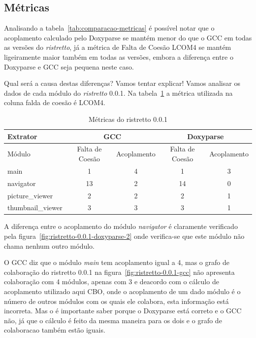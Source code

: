 \subsection{Métricas}

Analisando a tabela~\ref{tab:comparacao-metricas}  é possível notar que o acoplamento calculado pelo Doxyparse
se mantém menor do que o GCC em todas as versões do {\it ristretto}, já a métrica de
Falta de Coesão LCOM4 se mantém ligeiramente maior também em todas as versões,
embora a diferença entre o Doxyparse e GCC seja pequena neste caso.

Qual será a causa destas diferenças? Vamos tentar explicar! Vamos analisar os
dados de cada módulo do {\it ristretto} 0.0.1. Na
tabela~\ref{tab:comparacao-metricas-ristretto-0.0.1} a métrica utilizada na
coluna falda de coesão é LCOM4.

\begin{table}
\caption{Métricas do ristretto 0.0.1}
\centering
\begin{tabular}{| l | c c | c c |}
\hline
Extrator          & \multicolumn{2}{|c|}{GCC}        & \multicolumn{2}{|c|}{Doxyparse} \\
\hline
Módulo            & Falta de Coesão & Acoplamento    & Falta de Coesão & Acoplamento   \\
\hline
main              & 1               & 4              & 1               & 3             \\
navigator         & 13              & 2              & 14              & 0             \\
picture\_viewer   & 2               & 2              & 2               & 1             \\
thumbnail\_viewer & 3               & 3              & 3               & 1             \\
\hline
\end{tabular}
\label{tab:comparacao-metricas-ristretto-0.0.1}
\end{table}

A diferença entre o acoplamento do módulo {\it navigator} é claramente
verificado pela figura~\ref{fig:ristretto-0.0.1-doxyparse-2} onde verifica-se que
este módulo não chama nenhum outro módulo.

O GCC diz que o módulo {\it main} tem acoplamento igual a 4, mas o grafo de colaboração do ristretto 0.0.1 na figura~\ref{fig:ristretto-0.0.1-gcc} não apresenta colaboração com 4 módulos, apenas com 3 e deacordo com o cálculo de acoplamento utilizado aqui CBO, onde o acoplamento de um dado módulo é o número de outros módulos com os quais ele colabora, esta informação está incorreta. Mas o é importante saber porque o Doxyparse está correto e o GCC não, já que o cálculo é feito da mesma maneira para os dois e o grafo de colaboracao também estão iguais.

